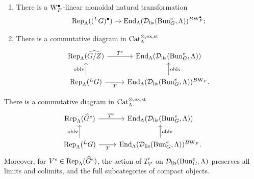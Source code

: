  \begin{corol}\label{cor:maindiag}
 \begin{enumerate}
 \item{There is a $\mathrm{W}_F^{\bullet}$-linear monoidal natural transformation 
\begin{equation*}
\mathrm{Rep}_{\Lambda}(({^L}G)^{\bullet}) \to \mathrm{End}_{\Lambda}(\mathcal{D}_{\textnormal{lis}}(\mathrm{Bun}_{G}^{e},\Lambda))^{B\mathrm{W}_F^{\bullet}};
\end{equation*}
}
    \item{There is a commutative diagram in $\mathrm{Cat}^{\otimes,\mathrm{ex}, \mathrm{st}}_{\Lambda}$  
\[\begin{tikzcd}
	{\Rep_{\Lambda}(\widehat{G/Z})} & {\End_{\Lambda}(\mc{D}_{\tn{lis}}(\Bun_{G}^{e},\Lambda)) } \\
	{\Rep_{\Lambda}({^L}G}) & {\End_{\Lambda}(\mc{D}_{\tn{lis}}(\Bun_{G}^{e},\Lambda))^{B\Weil_{F}}.}
	\arrow["{T^e}", from=1-1, to=1-2]
	\arrow["\oblv", from=2-1, to=1-1]
	\arrow["T"', from=2-1, to=2-2]
	\arrow["\oblv"', from=2-2, to=1-2]
\end{tikzcd}\]}

\end{enumerate}
 \end{corol}

\begin{thm}\label{thm:diagHckact}
     There is a commutative diagram in $\mathrm{Cat}^{\otimes,\mathrm{ex}, \mathrm{st}}_{\Lambda}$  
\[\begin{tikzcd}
	{\Rep_{\Lambda}(\widehat{G}^{e})} & {\End_{\Lambda}(\mc{D}_{\tn{lis}}(\Bun_{G}^{e},\Lambda)) } \\
	{\Rep_{\Lambda}({^L}G}) & {\End_{\Lambda}(\mc{D}_{\tn{lis}}(\Bun_{G}^{e},\Lambda))^{B\Weil_{F}}.}
	\arrow["{T^e}", from=1-1, to=1-2]
	\arrow["\oblv", from=2-1, to=1-1]
	\arrow["T"', from=2-1, to=2-2]
	\arrow["\oblv"', from=2-2, to=1-2]
\end{tikzcd}\]
Moreover, for $V^{e} \in \mathrm{Rep}_{\Lambda}(\widehat{G}^{e})$, the action of $T^{e}_{V^{e}}$ on $\mathcal{D}_{\textnormal{lis}}(\mathrm{Bun}_{G}^{e},\Lambda)$ preserves all
limits and colimits, and the full subcategories of compact objects.
 \end{thm}

